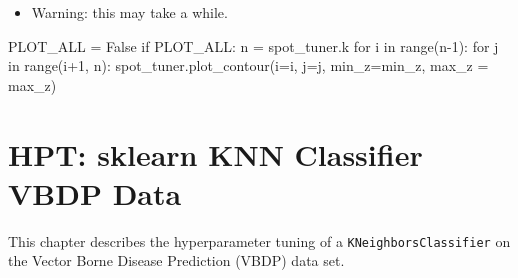\documentclass[
  letterpaper,
  DIV=11,
  numbers=noendperiod]{scrreprt}
\newenvironment{Shaded}{\begin{snugshade}}{\end{snugshade}}
\newcommand{\BuiltInTok}[1]{\textcolor[rgb]{0.00,0.23,0.31}{#1}}
\newcommand{\ControlFlowTok}[1]{\textcolor[rgb]{0.00,0.23,0.31}{#1}}
\newcommand{\DecValTok}[1]{\textcolor[rgb]{0.68,0.00,0.00}{#1}}
\newcommand{\KeywordTok}[1]{\textcolor[rgb]{0.00,0.23,0.31}{#1}}
\newcommand{\NormalTok}[1]{\textcolor[rgb]{0.00,0.23,0.31}{#1}}
\newcommand{\OperatorTok}[1]{\textcolor[rgb]{0.37,0.37,0.37}{#1}}
\newcommand{\VariableTok}[1]{\textcolor[rgb]{0.07,0.07,0.07}{#1}}
\providecommand{\tightlist}{%
  \setlength{\itemsep}{0pt}\setlength{\parskip}{0pt}}\usepackage{longtable,booktabs,array}
\begin{document}
\begin{itemize}
\tightlist
\item
  Warning: this may take a while.
\end{itemize}

\begin{Shaded}
\begin{Highlighting}[]
\NormalTok{PLOT\_ALL }\OperatorTok{=} \VariableTok{False}
\ControlFlowTok{if}\NormalTok{ PLOT\_ALL:}
\NormalTok{    n }\OperatorTok{=}\NormalTok{ spot\_tuner.k}
    \ControlFlowTok{for}\NormalTok{ i }\KeywordTok{in} \BuiltInTok{range}\NormalTok{(n}\OperatorTok{{-}}\DecValTok{1}\NormalTok{):}
        \ControlFlowTok{for}\NormalTok{ j }\KeywordTok{in} \BuiltInTok{range}\NormalTok{(i}\OperatorTok{+}\DecValTok{1}\NormalTok{, n):}
\NormalTok{            spot\_tuner.plot\_contour(i}\OperatorTok{=}\NormalTok{i, j}\OperatorTok{=}\NormalTok{j, min\_z}\OperatorTok{=}\NormalTok{min\_z, max\_z }\OperatorTok{=}\NormalTok{ max\_z)}
\end{Highlighting}
\end{Shaded}

\hypertarget{sec-hpt-sklearn-knn-classifier-vbdp-data}{%
\chapter{HPT: sklearn KNN Classifier VBDP
Data}\label{sec-hpt-sklearn-knn-classifier-vbdp-data}}

This chapter describes the hyperparameter tuning of a
\texttt{KNeighborsClassifier} on the Vector Borne Disease Prediction
(VBDP) data set.
\end{document}
